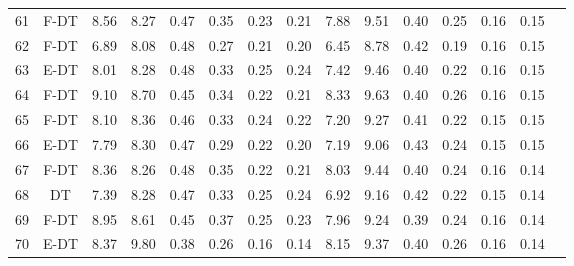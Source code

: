 \begin{longtable}{@{\hskip3pt}c@{\hskip3pt}c@{\hskip3pt}c@{\hskip3pt}c@{\hskip3pt}c@{\hskip3pt}c@{\hskip3pt}c@{\hskip3pt}c@{\hskip3pt}c@{\hskip3pt}c@{\hskip3pt}c@{\hskip3pt}c@{\hskip3pt}c@{\hskip3pt}c@{\hskip3pt}c}
         61 &           F-DT &              8.56 &        8.27 &          0.47 &        0.35 &        0.23 &         0.21 &                7.88 &        9.51 &          0.40 &        0.25 &        0.16 &         0.15 \\
         62 &           F-DT &              6.89 &        8.08 &          0.48 &        0.27 &        0.21 &         0.20 &                6.45 &        8.78 &          0.42 &        0.19 &        0.16 &         0.15 \\
         63 &           E-DT &              8.01 &        8.28 &          0.48 &        0.33 &        0.25 &         0.24 &                7.42 &        9.46 &          0.40 &        0.22 &        0.16 &         0.15 \\
         64 &           F-DT &              9.10 &        8.70 &          0.45 &        0.34 &        0.22 &         0.21 &                8.33 &        9.63 &          0.40 &        0.26 &        0.16 &         0.15 \\
         65 &           F-DT &              8.10 &        8.36 &          0.46 &        0.33 &        0.24 &         0.22 &                7.20 &        9.27 &          0.41 &        0.22 &        0.15 &         0.15 \\
         66 &           E-DT &              7.79 &        8.30 &          0.47 &        0.29 &        0.22 &         0.20 &                7.19 &        9.06 &          0.43 &        0.24 &        0.15 &         0.15 \\
         67 &           F-DT &              8.36 &        8.26 &          0.48 &        0.35 &        0.22 &         0.21 &                8.03 &        9.44 &          0.40 &        0.24 &        0.16 &         0.14 \\
         68 &             DT &              7.39 &        8.28 &          0.47 &        0.33 &        0.25 &         0.24 &                6.92 &        9.16 &          0.42 &        0.22 &        0.15 &         0.14 \\
         69 &           F-DT &              8.95 &        8.61 &          0.45 &        0.37 &        0.25 &         0.23 &                7.96 &        9.24 &          0.39 &        0.24 &        0.16 &         0.14 \\
         70 &           E-DT &              8.37 &        9.80 &          0.38 &        0.26 &        0.16 &         0.14 &                8.15 &        9.37 &          0.40 &        0.26 &        0.16 &         0.14 \\

\end{longtable}
